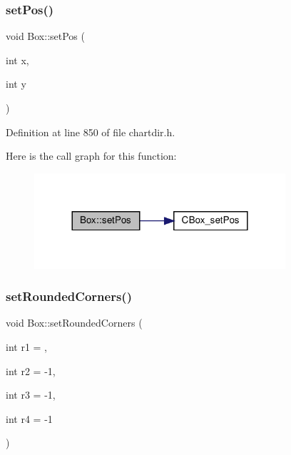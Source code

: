 \subsubsection{\texorpdfstring{set\+Pos()}{setPos()}}
{\footnotesize\ttfamily void Box\+::set\+Pos (\begin{DoxyParamCaption}\item[{int}]{x,  }\item[{int}]{y }\end{DoxyParamCaption})\hspace{0.3cm}{\ttfamily [inline]}}



Definition at line 850 of file chartdir.\+h.

Here is the call graph for this function\+:
\nopagebreak
\begin{figure}[H]
\begin{center}
\leavevmode
\includegraphics[width=264pt]{class_box_ac8dde107dbf1f30374b7c037185fe486_cgraph}
\end{center}
\end{figure}
\mbox{\label{class_box_a6b95c4540afd7f1493742169c01aa0a6}} 
\subsubsection{\texorpdfstring{set\+Rounded\+Corners()}{setRoundedCorners()}}
{\footnotesize\ttfamily void Box\+::set\+Rounded\+Corners (\begin{DoxyParamCaption}\item[{int}]{r1 = {},  }\item[{int}]{r2 = {\ttfamily -\/1},  }\item[{int}]{r3 = {\ttfamily -\/1},  }\item[{int}]{r4 = {\ttfamily -\/1} }\end{DoxyParamCaption})\hspace{0.3cm}{\ttfamily [inline]}}



